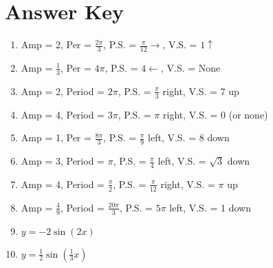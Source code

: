 \newpage

\section{Answer Key}

\begin{enumerate}
	\item Amp = 2, Per = $\frac{2\pi}{3}$, P.S. = $\frac{\pi}{12} \rightarrow$, V.S. = $1 \uparrow$
    \item Amp = $\frac{1}{3}$, Per = $4\pi$, P.S. = $4 \leftarrow$, V.S. = None
    \item Amp = 2, Period = $2\pi$, P.S. = $\frac{\pi}{3}$ right, V.S. = 7 up
    \item Amp = 4, Period = $3\pi$, P.S. = $\pi$ right, V.S. = 0 (or none)
    \item Amp = 1, Per = $\frac{8\pi}{3}$, P.S. = $\frac{\pi}{9}$ left, V.S. = 8 down
	\item Amp = 3, Period = $\pi$, P.S. = $\frac{\pi}{4}$ left, V.S. = $\sqrt{3}$ down
	\item Amp = 4, Period = $\frac{\pi}{2}$, P.S. = $\frac{\pi}{12}$ right, V.S. = $\pi$ up
	\item Amp = $\frac{4}{9}$, Period = $\frac{20\pi}{3}$, P.S. = $5\pi$ left, V.S. = 1 down
    
    \item $y = -2\sin(2x)$
	\item $y = \frac{1}{2}\sin\left(\frac{1}{3}x\right)$
\end{enumerate}
